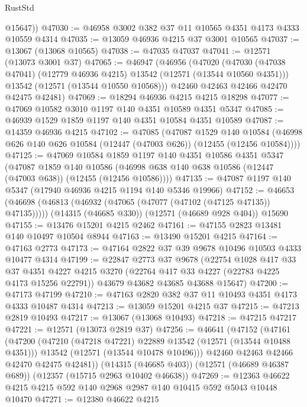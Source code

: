 \begin{lexlean}{RustStd}
\begin{coremodule}
        @15647))
@47030 := @46958 @3002 @382 @37 @11 @10565 @4351 @4173 @4333 @10559 @4314
@47035 := @13059 @46936 @4215 @37 @3001 @10565
@47037 := @13067 (@13068 @10565)
@47038 := @47035 @47037
@47041 := @12571 (@13073 @3001 @37)
@47065 := @46947
    (@46956
      (@47020
        (@47030 (@47038 @47041) (@12779 @46936 @4215) @13542 (@12571 (@13544 @10560 @4351)))
        @13542
        (@12571 (@13544 @10550 @10568)))
      @42460
      @42463
      @42466
      @42470
      @42475
      @42481)
@47069 := @18294 @46936 @4215 @4215 @18298
@47077 := @47069 @10582 @3010 @1197 @140 @4351 @10589 @4351 @5347
@47085 := @46939 @1529 @1859 @1197 @140 @4351 @10584 @4351 @10589
@47087 := @14359 @46936 @4215
@47102 := @47085
    (@47087
      @1529
      @140
      @10584
      (@46998 @626 @140 @626 @10584 (@12447 (@47003 @626)) (@12455 (@12456 @10584))))
@47125 := @47069
    @10584
    @1859
    @1197
    @140
    @4351
    @10586
    @4351
    @5347
    (@47087
      @1859
      @140
      @10586
      (@46998 @638 @140 @638 @10586 (@12447 (@47003 @638)) (@12455 (@12456 @10586))))
@47135 := @47087 @1197 @140 @5347 (@17940 @46936 @4215 @1194 @140 @5346 @19966)
@47152 := @46653
    (@46698 (@46813 (@46932 (@47065 (@47077 (@47102 (@47125 @47135)) @47135)))))
    (@14315 (@46685 @330))
    (@12571 (@46689 @928 @404))
    @15690
@47155 := @13476 @15201 @4215 @2462
@47161 := @47155 @2823 @13481 @140 @10497 @10504 @8944
@47163 := @13490 @15201 @4215
@47164 := @47163 @2773
@47173 := @47164 @2822 @37 @39 @9678 @10496 @10503 @4333 @10477 @4314
@47199 := @22847
    @2773
    @37
    @9678
    (@22754
      @1028
      @417
      @33
      @37
      @4351
      @4227
      @4215
      @3270
      (@22764 @417 @33 @4227 (@22783 @4225 @4173 @15256 @22791))
      @43679
      @43682
      @43685
      @43688
      @15647)
@47200 := @47173 @47199
@47210 := @47163 @2820 @382 @37 @11 @10493 @4351 @4173 @4333 @10487 @4314
@47213 := @13059 @15201 @4215 @37
@47215 := @47213 @2819 @10493
@47217 := @13067 (@13068 @10493)
@47218 := @47215 @47217
@47221 := @12571 (@13073 @2819 @37)
@47256 := @46641
    (@47152
      (@47161
        (@47200
          (@47210 (@47218 @47221) @22889 @13542 (@12571 (@13544 @10488 @4351)))
          @13542
          (@12571 (@13544 @10478 @10496)))
        @42460
        @42463
        @42466
        @42470
        @42475
        @42481))
    (@14315 (@46685 @403))
    (@12571 (@46689 @46387 @689))
    (@12357 (@15715 @2963 @10402 @46638))
@47269 := @12363 @46622 @4215 @4215 @592 @140 @2968 @2987 @140 @10415 @592 @5043 @10448 @10470
@47271 := @12380 @46622 @4215

\end{coremodule}
\end{lexlean}
